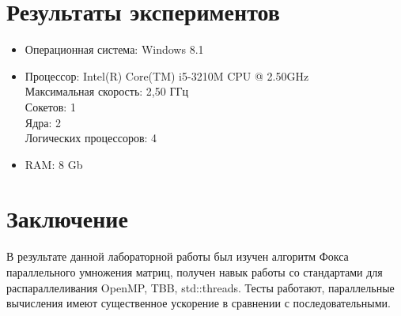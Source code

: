 \documentclass[12pt]{article}
\begin{document}
\newpage

\section*{Результаты экспериментов}
\begin{itemize}
	\item Операционная система: Windows 8.1
	\item Процессор: 
	Intel(R) Core(TM) i5-3210M CPU @ 2.50GHz\\
	Максимальная скорость:	2,50 ГГц\\
	Сокетов:	1\\
	Ядра:	2\\
	Логических процессоров:	4
	\item RAM: 8 Gb
\end{itemize}
\begin{center}
    

\begin{table}[!h]
\caption{Результаты экспериментов}
\end{table}
\end{center}


\newpage

\section*{Заключение}
В результате данной лабораторной работы был изучен алгоритм Фокса параллельного умножения матриц, получен навык работы со стандартами для распараллеливания OpenMP, TBB, std::threads. Тесты работают, параллельные вычисления имеют существенное ускорение в сравнении с последовательными.\par
\end{document}

